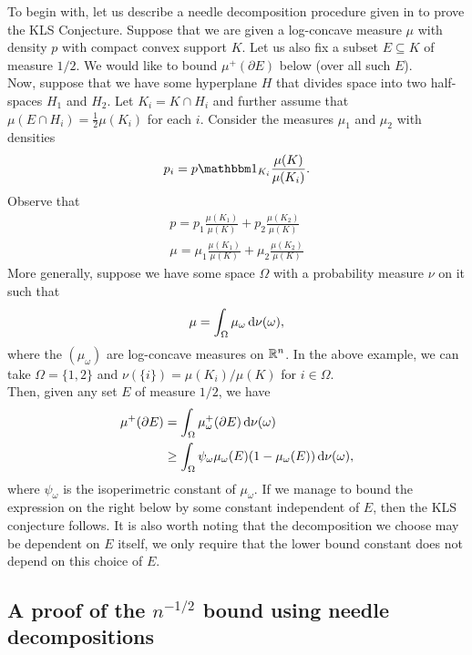 \documentclass{article}
\begin{document}
To begin with, let us describe a needle decomposition procedure given in \cite{leevempala2018klssurvey} to prove the KLS Conjecture. Suppose that we are given a log-concave measure $\mu$ with density $p$ with compact convex support $K$. Let us also fix a subset $E\subseteq K$ of measure $1/2$. We would like to bound $\mu^+(\partial E)$ below (over all such $E$).\\
Now, suppose that we have some hyperplane $H$ that divides space into two half-spaces $H_1$ and $H_2$. Let $K_i = K \cap H_i$ and further assume that $\mu(E \cap H_i) = \frac{1}{2}\mu(K_i)$ for each $i$. Consider the measures $\mu_1$ and $\mu_2$ with densities
\[ p_i = p \indic_{K_i} \frac{\mu(K)}{\mu(K_i)}. \]
Observe that
\begin{equation}
	\label{eqn 1}
	\begin{gathered}
		p = p_1 \frac{\mu(K_1)}{\mu(K)} + p_2 \frac{\mu(K_2)}{\mu(K)} \\
		\mu = \mu_1 \frac{\mu(K_1)}{\mu(K)} + \mu_2 \frac{\mu(K_2)}{\mu(K)}
	\end{gathered}
\end{equation}
More generally, suppose we have some space $\Omega$ with a probability measure $\nu$ on it such that
\begin{equation}
	\label{eqn 2: disintegration}
	\mu = \int_\Omega \mu_{\omega} \operatorname{d}\!{\nu}(\omega),
\end{equation}
where the $(\mu_\omega)$ are log-concave measures on $\mathbb{R}^n$. In the above example, we can take $\Omega = \{1,2\}$ and $\nu(\{i\}) = \mu(K_i) / \mu(K)$ for $i\in\Omega$.\\
Then, given any set $E$ of measure $1/2$, we have
\begin{align}
	\mu^+(\partial E) &= \int_{\Omega} \mu_\omega^+(\partial E) \operatorname{d}\!{\nu}(\omega)  \nonumber \\
		&\geq \int_\Omega \psi_\omega \mu_\omega(E) (1-\mu_\omega(E)) \operatorname{d}\!{\nu}(\omega), \label{eqn 4}
\end{align}
where $\psi_\omega$ is the isoperimetric constant of $\mu_\omega$. If we manage to bound the expression on the right below by some constant independent of $E$, then the KLS conjecture follows. It is also worth noting that the decomposition we choose may be dependent on $E$ itself, we only require that the lower bound constant does not depend on this choice of $E$.

\subsection{A proof of the \texorpdfstring{$n^{-1/2}$}{n-12} bound using needle decompositions}
\end{document}
